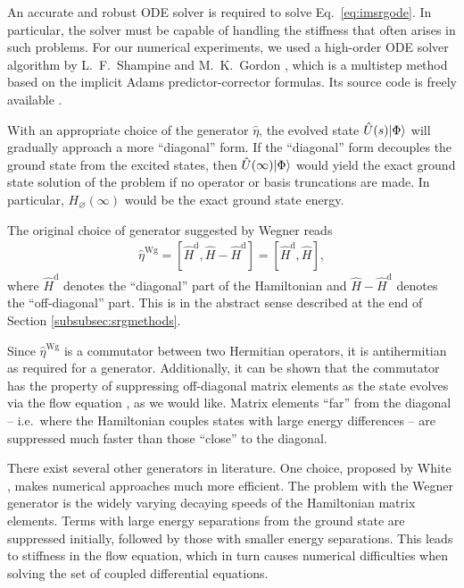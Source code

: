 An accurate and robust ODE solver is required to solve Eq.\ \eqref{eq:imsrgode}.  In particular, the solver must be capable of handling the stiffness that often arises in such problems.  For our numerical experiments, we used a high-order ODE solver algorithm by L.\ F.\ Shampine and M.\ K.\ Gordon \cite{shampine1975computer}, which is a multistep method based on the implicit Adams predictor-corrector formulas.  Its source code is freely available \cite{odesolver}.

With an appropriate choice of the generator $\hat{\eta}$, the evolved state $\hat U(s) | \Phi \rangle$ will gradually approach a more ``diagonal'' form.  If the ``diagonal'' form decouples the ground state from the excited states, then $\hat U(\infty) | \Phi \rangle$ would yield the exact ground state solution of the problem if no operator or basis truncations are made.  In particular, $H_\varnothing(\infty)$ would be the exact ground state energy.

The original choice of generator suggested by Wegner \cite{Wegner200177} reads
\begin{align*}
  \hat{\eta}^{\text{Wg}}
  = [\hat{H}^{\text{d}}, \hat{H} - \hat{H}^{\text{d}}]
  = [\hat{H}^{\text{d}}, \hat{H}],
\end{align*}
where $\hat{H}^{\text{d}}$ denotes the ``diagonal'' part of the Hamiltonian and $\hat{H} - \hat{H}^{\text{d}}$ denotes the ``off-diagonal'' part.  This is in the abstract sense described at the end of Section \ref{subsubsec:srgmethods}.

Since $\hat{\eta}^{\text{Wg}}$ is a commutator between two Hermitian operators, it is antihermitian as required for a generator.  Additionally, it can be shown that the commutator has the property of suppressing off-diagonal matrix elements as the state evolves via the flow equation \cite{kehrein2006flow}, as we would like.  Matrix elements ``far'' from the diagonal -- i.e.\ where the Hamiltonian couples states with large energy differences -- are suppressed much faster than those ``close'' to the diagonal.

There exist several other generators in literature.  One choice, proposed by White \cite{White:cond-mat0201346}, makes numerical approaches much more efficient.  The problem with the Wegner generator is the widely varying decaying speeds of the Hamiltonian matrix elements.  Terms with large energy separations from the ground state are suppressed initially, followed by those with smaller energy separations.  This leads to stiffness in the flow equation, which in turn causes numerical difficulties when solving the set of coupled differential equations.

